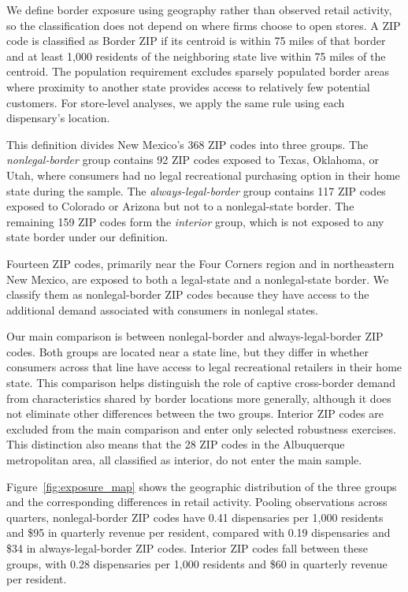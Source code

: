 \documentclass[english,12pt]{article}
\begin{document}
We define border exposure using geography rather than observed retail activity, so the classification does not depend on where firms choose to open stores. A ZIP code is classified as Border ZIP if its centroid is within 75 miles of that border and at least 1,000 residents of the neighboring state live within 75 miles of the centroid. The population requirement excludes sparsely populated border areas where proximity to another state provides access to relatively few potential customers. For store-level analyses, we apply the same rule using each dispensary's location.

This definition divides New Mexico's 368 ZIP codes into three groups. The \emph{nonlegal-border} group contains 92 ZIP codes exposed to Texas, Oklahoma, or Utah, where consumers had no legal recreational purchasing option in their home state during the sample. The \emph{always-legal-border} group contains 117 ZIP codes exposed to Colorado or Arizona but not to a nonlegal-state border. The remaining 159 ZIP codes form the \emph{interior} group, which is not exposed to any state border under our definition.

Fourteen ZIP codes, primarily near the Four Corners region and in northeastern New Mexico, are exposed to both a legal-state and a nonlegal-state border. We classify them as nonlegal-border ZIP codes because they have access to the additional demand associated with consumers in nonlegal states.

Our main comparison is between nonlegal-border and always-legal-border ZIP codes. Both groups are located near a state line, but they differ in whether consumers across that line have access to legal recreational retailers in their home state. This comparison helps distinguish the role of captive cross-border demand from characteristics shared by border locations more generally, although it does not eliminate other differences between the two groups. Interior ZIP codes are excluded from the main comparison and enter only selected robustness exercises. This distinction also means that the 28 ZIP codes in the Albuquerque metropolitan area, all classified as interior, do not enter the main sample.

Figure~\ref{fig:exposure_map} shows the geographic distribution of the three groups and the corresponding differences in retail activity. Pooling observations across quarters, nonlegal-border ZIP codes have 0.41 dispensaries per 1,000 residents and \$95 in quarterly revenue per resident, compared with 0.19 dispensaries and \$34 in always-legal-border ZIP codes. Interior ZIP codes fall between these groups, with 0.28 dispensaries per 1,000 residents and \$60 in quarterly revenue per resident.
\end{document}
